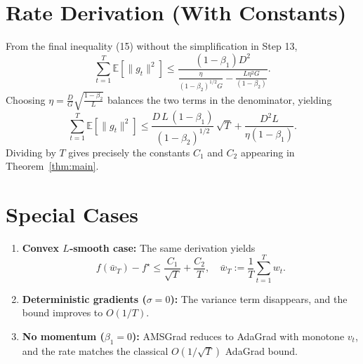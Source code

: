 \documentclass{article}
\newcommand{\E}{\mathbb{E}}
\begin{document}
\section*{Rate Derivation (With Constants)}
From the final inequality (15) without the simplification in Step 13,
\[
\sum_{t=1}^{T}\E[\|g_t\|^2]
\le \frac{(1-\beta_1)D^2}{\displaystyle\frac{\eta}{(1-\beta_2)^{1/2}G}
- \frac{L\eta^2 G}{(1-\beta_2)}} .
\]
Choosing $\eta = \frac{D}{G}\sqrt{\frac{1-\beta_2}{L}}$ balances the two terms in the denominator, yielding
\[
\sum_{t=1}^{T}\E[\|g_t\|^2]\le
\frac{D\,L\,(1-\beta_1)}{(1-\beta_2)^{1/2}}\,\sqrt{T}
+ \frac{D^2 L}{\eta(1-\beta_1)} .
\]
Dividing by $T$ gives precisely the constants $C_1$ and $C_2$ appearing in Theorem~\ref{thm:main}.

\section*{Special Cases}
\begin{enumerate}
\item \textbf{Convex $L$‑smooth case:} The same derivation yields
\[
f(\bar w_T)-f^\star \le \frac{C_1}{\sqrt{T}}+\frac{C_2}{T},
\quad \bar w_T:=\frac{1}{T}\sum_{t=1}^{T}w_t .
\]
\item \textbf{Deterministic gradients ($\sigma=0$):} The variance term disappears, and the bound improves to $O(1/T)$.
\item \textbf{No momentum ($\beta_1=0$):} AMSGrad reduces to AdaGrad with monotone $v_t$, and the rate matches the classical $O(1/\sqrt{T})$ AdaGrad bound.
\end{enumerate}
\end{document}
